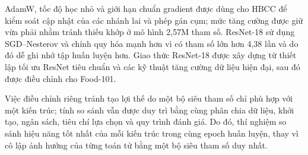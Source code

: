 \documentclass[conference]{IEEEtran}
\begin{document}
\begin{table}[ht!]
  \caption{Siêu tham số huấn luyện riêng cho từng kiến trúc trên
           Food-101.}
  \label{tab:food_recipe}
  \centering
  \renewcommand{\arraystretch}{1.10}
\end{table}

AdamW, tốc độ học nhỏ và giới hạn chuẩn gradient được dùng cho HBCC
để kiểm soát cập nhật của các nhánh lai và phép gán cụm; mức tăng
cường được giữ vừa phải nhằm tránh thiếu khớp ở mô hình 2,57M tham
số. ResNet-18 sử dụng SGD--Nesterov và chính quy hóa mạnh hơn vì có
tham số lớn hơn 4,38 lần và do đó dễ ghi nhớ tập huấn luyện
hơn. Giao thức ResNet-18 được xây dựng từ thiết lập tối ưu ResNet tiêu chuẩn và các kỹ thuật tăng cường dữ liệu hiện đại, sau đó được điều chỉnh cho Food-101.

Việc điều chỉnh riêng tránh tạo lợi thế do một bộ siêu tham số
chỉ phù hợp với một kiến trúc; tính so sánh vẫn được duy trì bằng
cùng phân chia dữ liệu, khởi tạo, ngân sách, tiêu chí lựa chọn và quy
trình đánh giá. Do đó, thí nghiệm so sánh hiệu năng tốt nhất
của mỗi kiến trúc trong cùng epoch huấn luyện, thay vì cô lập ảnh hưởng của từng toán tử bằng một bộ siêu tham số duy nhất.
\end{document}
